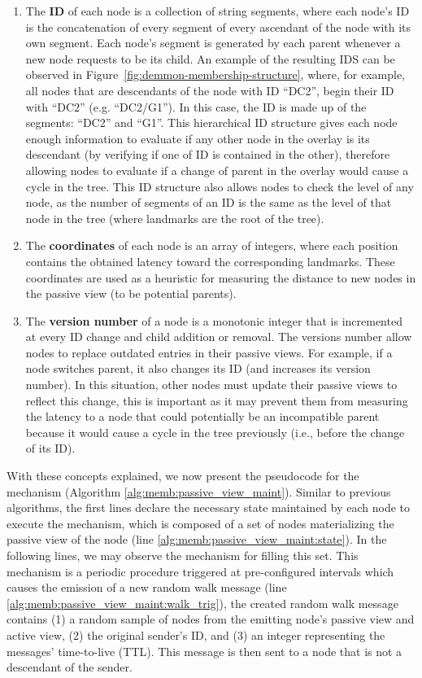 \begin{enumerate}
    \item The \textbf{ID} of each node is a collection of string segments, where each node's ID is the concatenation of every segment of every ascendant of the node with its own segment. Each node's segment is generated by each parent whenever a new node requests to be its child. An example of the resulting IDS can be observed in Figure~\ref{fig:demmon-membership-structure}, where, for example, all nodes that are descendants of the node with ID ``DC2'', begin their ID with ``DC2'' (e.g. ``DC2/G1''). In this case, the ID is made up of the segments: ``DC2'' and ``G1''. This hierarchical ID structure gives each node enough information to evaluate if any other node in the overlay is its descendant (by verifying if one of ID is contained in the other), therefore allowing nodes to evaluate if a change of parent in the overlay would cause a cycle in the tree. This ID structure also allows nodes to check the level of any node, as the number of segments of an ID is the same as the level of that node in the tree (where landmarks are the root of the tree).
    
    \item The \textbf{coordinates} of each node is an array of integers, where each position contains the obtained latency toward the corresponding landmarks. These coordinates are used as a heuristic for measuring the distance to new nodes in the passive view (to be potential parents).
    
    \item The \textbf{version number} of a node is a monotonic integer that is incremented at every ID change and child addition or removal. The versions number allow nodes to replace outdated entries in their passive views. For example, if a node switches parent, it also changes its ID (and increases its version number). In this situation, other nodes must update their passive views to reflect this change, this is important as it may prevent them from measuring the latency to a node that could potentially be an incompatible parent because it would cause a cycle in the tree previously (i.e., before the change of its ID).
\end{enumerate}

With these concepts explained, we now present the pseudocode for the mechanism (Algorithm \ref{alg:memb:passive_view_maint}). Similar to previous algorithms, the first lines declare the necessary state maintained by each node to execute the mechanism, which is composed of a set of nodes materializing the passive view of the node (line \ref{alg:memb:passive_view_maint:state}). In the following lines, we may observe the mechanism for filling this set. This mechanism is a periodic procedure triggered at pre-configured intervals which causes the emission of a new random walk message (line \ref{alg:memb:passive_view_maint:walk_trig}), the created random walk message contains (1) a random sample of nodes from the emitting node's passive view and active view, (2) the original sender's ID, and (3) an integer representing the messages' time-to-live (TTL). This message is then sent to a node that is not a descendant of the sender.

